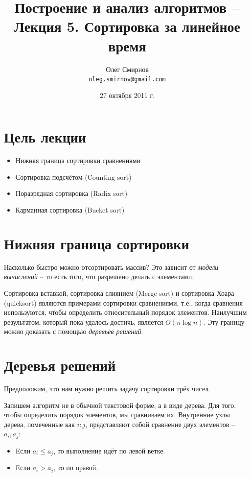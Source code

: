 \documentclass[a4paper,11pt]{article}
\author{Олег Смирнов\\
\texttt{oleg.smirnov@gmail.com}}
\date{27 октября 2011 г.}
\title{Построение и анализ алгоритмов -- Лекция 5. Сортировка за линейное время}
\begin{document}
\maketitle
\tableofcontents
\newpage

\setlength{\parskip}{1ex plus 0.5ex minus 0.2ex}

\section*{Цель лекции}
\begin{itemize}
\item Нижняя граница сортировки сравнениями
\item Сортировка подсчётом (Counting sort)
\item Поразрядная сортировка (Radix sort)
\item Карманная сортировка (Bucket sort)
\end{itemize}

\section{Нижняя граница сортировки}
Насколько быстро можно отсортировать массив? Это зависит от \emph{модели
вычислений} -- то есть того, что разрешено делать с элементами.

Сортировка вставкой, сортировка слиянием (Merge sort) и сортировка Хоара
(quicksort) являются примерами сортировки сравнениями, т.е., когда сравнения
используются, чтобы определить относительный порядок элементов. Наилучшим
результатом, который пока удалось достичь, является $O(n \log n)$. Эту границу
можно доказать с помощью \emph{деревьев решений}.

\section{Деревья решений}
Предположим, что нам нужно решить задачу сортировки трёх чисел.

Запишем алгоритм не в обычной текстовой форме, а в виде дерева. Для того, чтобы
определить порядок элементов, мы сравниваем их. Внутренние узлы дерева, 
помеченные как $i:j$, представляют собой сравнение двух элементов -- $a_i, a_j$:
\begin{itemize}
\item Eсли $a_i \leqslant a_j$, то выполнение идёт по левой ветке.
\item Eсли $a_i > a_j$, то по правой.
\end{itemize}
\end{document}
